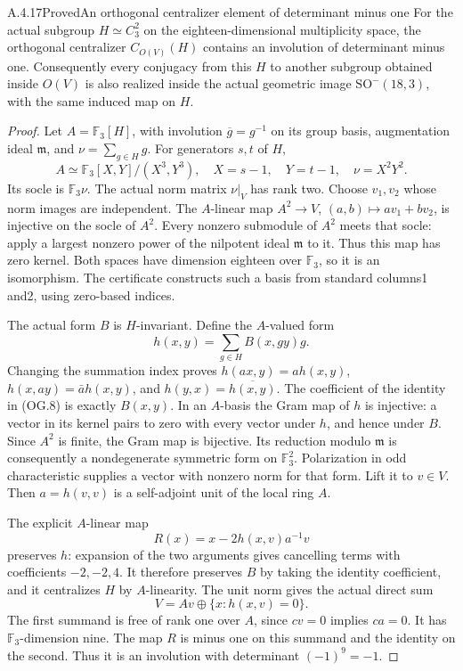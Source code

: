 \begin{result}{A.4.17}{Proved}{An orthogonal centralizer element of determinant minus one}
\label{lem:orthogonal-centralizer-determinant}
For the actual subgroup \(H\simeq C_3^2\)
on the eighteen-dimensional multiplicity space,
the orthogonal centralizer \(C_{O(V)}(H)\)
contains an involution of determinant minus one.
Consequently every conjugacy from this \(H\)
to another subgroup obtained inside \(O(V)\)
is also realized inside the actual geometric
image \(\mathrm{SO}^-(18,3)\), with the same
induced map on \(H\).
\end{result}
\begin{proof}
Let \(A=\mathbb F_3[H]\), with involution
\(\overline g=g^{-1}\) on its group basis,
augmentation ideal \(\mathfrak m\), and
\(\nu=\sum_{g\in H}g\).
For generators \(s,t\) of \(H\),
\[
 A\simeq\mathbb F_3[X,Y]/(X^3,Y^3),
 \quad X=s-1,\quad Y=t-1,\quad \nu=X^2Y^2.
 \tag{OG.7}
\]
Its socle is \(\mathbb F_3\nu\).
The actual norm matrix \(\nu|_V\) has rank
two. Choose \(v_1,v_2\) whose norm images
are independent. The \(A\)-linear map
\(A^2\to V\), \((a,b)\mapsto av_1+bv_2\),
is injective on the socle of \(A^2\).
Every nonzero submodule of \(A^2\) meets
that socle: apply a largest nonzero power
of the nilpotent ideal \(\mathfrak m\)
to it. Thus this map has zero kernel.
Both spaces have dimension eighteen over
\(\mathbb F_3\), so it is an isomorphism.
The certificate constructs such a basis
from standard columns1 and2, using zero-based
indices.

The actual form \(B\) is \(H\)-invariant.
Define the \(A\)-valued form
\[
 h(x,y)=\sum_{g\in H}B(x,gy)g.
 \tag{OG.8}
\]
Changing the summation index proves
\(h(ax,y)=a h(x,y)\),
\(h(x,ay)=\bar a h(x,y)\), and
\(h(y,x)=\overline{h(x,y)}\).
The coefficient of the identity in (OG.8)
is exactly \(B(x,y)\).
In an \(A\)-basis the Gram map of \(h\)
is injective: a vector in its kernel pairs
to zero with every vector under \(h\),
and hence under \(B\). Since \(A^2\) is
finite, the Gram map is bijective.
Its reduction modulo \(\mathfrak m\)
is consequently a nondegenerate symmetric
form on \(\mathbb F_3^2\).
Polarization in odd characteristic supplies
a vector with nonzero norm for that form.
Lift it to \(v\in V\). Then
\(a=h(v,v)\) is a self-adjoint unit of
the local ring \(A\).

The explicit \(A\)-linear map
\[
                R(x)=x-2h(x,v)a^{-1}v
 \tag{OG.9}
\]
preserves \(h\): expansion of the two
arguments gives cancelling terms with
coefficients \(-2,-2,4\).
It therefore preserves \(B\) by taking
the identity coefficient, and it centralizes
\(H\) by \(A\)-linearity.
The unit norm gives the actual direct sum
\[
 V=Av\oplus\{x:h(x,v)=0\}.
 \tag{OG.10}
\]
The first summand is free of rank one over
\(A\), since \(cv=0\) implies \(ca=0\).
It has \(\mathbb F_3\)-dimension nine.
The map \(R\) is minus one on this summand
and the identity on the second. Thus it
is an involution with determinant
\((-1)^9=-1\).


\end{proof}
